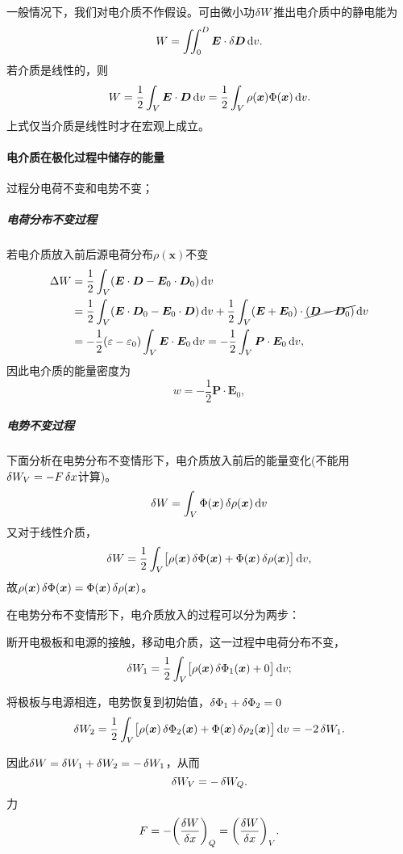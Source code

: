 一般情况下，我们对电介质不作假设。可由微小功$\mathop{}\!\delta W$推出电介质中的静电能为
\[
    W=\iint_0^D\bm E\cdot\mathop{}\!\delta\bm D\mathop{}\!\mathrm{d} v.
\]
若介质是线性的，则
\begin{equation}
    W=\frac12\int_V\bm E\cdot\bm D\mathop{}\!\mathrm{d} v=\frac12\int_V\rho(\bm x)\Phi(\bm x)\mathop{}\!\mathrm{d} v.
\end{equation}
上式仅当介质是线性时才在宏观上成立。
\paragraph{电介质在极化过程中储存的能量}过程分电荷不变和电势不变；
\subparagraph{电荷分布不变过程}
若电介质放入前后源电荷分布$\rho(\bm x)$不变
\begin{align*}
    \Delta W&=\frac12\int_V(\bm E\cdot\bm D-\bm E_0\cdot\bm D_0)\mathop{}\!\mathrm{d} v\\
    &=\frac12\int_V(\bm E\cdot\bm D_0-\bm E_0\cdot\bm D)\mathop{}\!\mathrm{d} v+\frac12\int_V(\bm E+\bm E_0)\cdot\cancel{(\bm D-\bm D_0)}\mathop{}\!\mathrm{d} v\\
    &=-\frac12(\varepsilon-\varepsilon_0)\int_V\bm E\cdot\bm E_0\mathop{}\!\mathrm{d} v=-\frac12\int_V\bm P\cdot\bm E_0\mathop{}\!\mathrm{d} v,
\end{align*}
因此电介质的能量密度为
\begin{equation}
    w=-\frac12\bm P\cdot\bm E_0,
\end{equation}
\subparagraph{电势不变过程}下面分析在电势分布不变情形下，电介质放入前后的能量变化(不能用$\mathop{}\!\delta W_V=-F\mathop{}\!\delta x$计算)。
\[
    \mathop{}\!\delta W=\int_V\Phi(\bm x)\mathop{}\!\delta\rho(\bm x)\mathop{}\!\mathrm{d} v
\]
又对于线性介质，
\[
    \mathop{}\!\delta W=\frac12\int_V\bigl[\rho(\bm x)\mathop{}\!\delta\Phi(\bm x)+\Phi(\bm x)\mathop{}\!\delta\rho(\bm x)\bigr]\mathop{}\!\mathrm{d} v,
\]
故$\rho(\bm x)\mathop{}\!\delta\Phi(\bm x)=\Phi(\bm x)\mathop{}\!\delta\rho(\bm x)$。

在电势分布不变情形下，电介质放入的过程可以分为两步：
\begin{compactenum}
    \item 断开电极板和电源的接触，移动电介质，这一过程中电荷分布不变，
    \[
        \mathop{}\!\delta W_1=\frac12\int_V\bigl[\rho(\bm x)\mathop{}\!\delta\Phi_1(\bm x)+0\bigr]\mathop{}\!\mathrm{d} v;
    \]
    \item 将极板与电源相连，电势恢复到初始值，$\mathop{}\!\delta\Phi_1+\mathop{}\!\delta\Phi_2=0$
    \[
        \mathop{}\!\delta W_2=\frac12\int_V\bigl[\rho(\bm x)\mathop{}\!\delta\Phi_2(\bm x)+\Phi(\bm x)\mathop{}\!\delta\rho_2(\bm x)\bigr]\mathop{}\!\mathrm{d} v=-2\mathop{}\!\delta W_1.
    \]
\end{compactenum}
因此$\mathop{}\!\delta W=\mathop{}\!\delta W_1+\mathop{}\!\delta W_2=-\mathop{}\!\delta W_1$，从而
\[
    \mathop{}\!\delta W_V=-\mathop{}\!\delta W_Q.
\]
力
\[
    F=-\biggl(\frac{\mathop{}\!\delta W}{\mathop{}\!\delta x}\biggr)_Q=\biggl(\frac{\mathop{}\!\delta W}{\mathop{}\!\delta x}\biggr)_V.
\]

